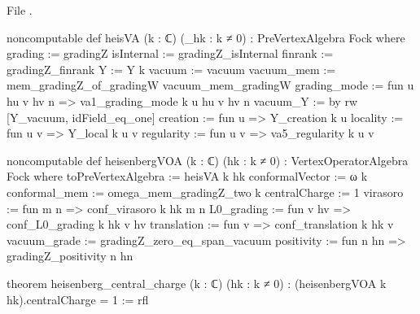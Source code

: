 \noindent File .
\begin{leancode}
noncomputable def heisVA (k : ℂ) (_hk : k ≠ 0) : PreVertexAlgebra Fock where
  grading := gradingZ
  isInternal := gradingZ_isInternal
  finrank := gradingZ_finrank
  Y := Y k
  vacuum := vacuum
  vacuum_mem := mem_gradingZ_of_gradingW vacuum_mem_gradingW
  grading_mode := fun u hu v hv n => va1_grading_mode k u hu v hv n
  vacuum_Y := by rw [Y_vacuum, idField_eq_one]
  creation := fun u => Y_creation k u
  locality := fun u v => Y_local k u v
  regularity := fun u v => va5_regularity k u v

noncomputable def heisenbergVOA (k : ℂ) (hk : k ≠ 0) : VertexOperatorAlgebra Fock where
  toPreVertexAlgebra := heisVA k hk
  conformalVector := ω k
  conformal_mem := omega_mem_gradingZ_two k
  centralCharge := 1
  virasoro := fun m n => conf_virasoro k hk m n
  L0_grading := fun v hv => conf_L0_grading k hk v hv
  translation := fun v => conf_translation k hk v
  vacuum_grade := gradingZ_zero_eq_span_vacuum
  positivity := fun n hn => gradingZ_positivity n hn

theorem heisenberg_central_charge (k : ℂ) (hk : k ≠ 0) :
    (heisenbergVOA k hk).centralCharge = 1 := rfl
\end{leancode}

